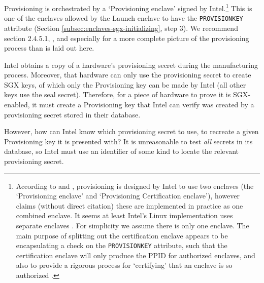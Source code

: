 
Provisioning is orchestrated by a `Provisioning enclave' signed by Intel.\footnote{According to \cite{sgx-extending-sgx-autonomy-and-anonymity-thesis} and \cite{sgx-remote-attestation-is-not-sufficient}, provisioning is designed by Intel to use two enclaves (the `Provisioning enclave' and `Provisioning Certification enclave'), however \cite{sgx-overview-part-2-externals-quarkslab} claims (without direct citation) these are implemented in practice as one combined enclave. It seems at least Intel's Linux implementation uses separate enclaves \cite{intel-lib-linux-sgx}. For simplicity we assume there is only one enclave. The main purpose of splitting out the certification enclave appears to be encapsulating a check on the {\tt PROVISIONKEY} attribute, such that the certification enclave will only produce the PPID for authorized enclaves, and also to provide a rigorous process for `certifying' that an enclave is so authorized \cite{intel-lib-linux-sgx}.} This is one of the enclaves allowed by the Launch enclave to have the {\tt PROVISIONKEY} attribute (Section \ref{subsec:enclaves-sgx-initializing}, step 3). We recommend \cite{sgx-extending-sgx-autonomy-and-anonymity-thesis} section 2.4.5.1, \cite{sgx-remote-attestation-is-not-sufficient}, and especially \cite{intel-lib-linux-sgx} for a more complete picture of the provisioning process than is laid out here.%

Intel obtains a copy of a hardware's provisioning secret during the manufacturing process. Moreover, that hardware can only use the provisioning secret to create SGX keys, of which only the Provisioning key can be made by Intel (all other keys use the seal secret). Therefore, for a piece of hardware to prove it is SGX-enabled, it must create a Provisioning key that Intel can verify was created by a provisioning secret stored in their database.

However, how can Intel know which provisioning secret to use, to recreate a given Provisioning key it is presented with? It is unreasonable to test {\em all} secrets in its database, so Intel must use an identifier of some kind to locate the relevant provisioning secret.

